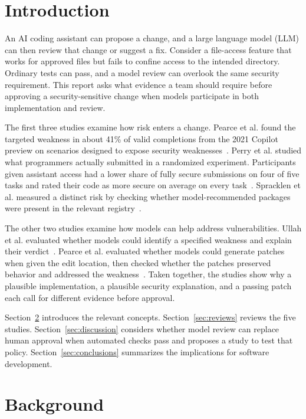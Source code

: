 \documentclass[conference]{IEEEtran}
\begin{document}
\section{Introduction}\label{sec:introduction}
An AI coding assistant can propose a change, and a large language model (LLM) can then review that change or suggest a fix. Consider a file-access feature that works for approved files but fails to confine access to the intended directory. Ordinary tests can pass, and a model review can overlook the same security requirement. This report asks what evidence a team should require before approving a security-sensitive change when models participate in both implementation and review.

The first three studies examine how risk enters a change. Pearce et al. found the targeted weakness in about 41\% of valid completions from the 2021 Copilot preview on scenarios designed to expose security weaknesses~\cite{pearce2025copilot}. Perry et al. studied what programmers actually submitted in a randomized experiment. Participants given assistant access had a lower share of fully secure submissions on four of five tasks and rated their code as more secure on average on every task~\cite{perry2023insecure}. Spracklen et al. measured a distinct risk by checking whether model-recommended packages were present in the relevant registry~\cite{spracklen2025packages}.

The other two studies examine how models can help address vulnerabilities. Ullah et al. evaluated whether models could identify a specified weakness and explain their verdict~\cite{ullah2024secllmholmes}. Pearce et al. evaluated whether models could generate patches when given the edit location, then checked whether the patches preserved behavior and addressed the weakness~\cite{pearce2023repair}. Taken together, the studies show why a plausible implementation, a plausible security explanation, and a passing patch each call for different evidence before approval.

Section~\ref{sec:background} introduces the relevant concepts. Section~\ref{sec:reviews} reviews the five studies. Section~\ref{sec:discussion} considers whether model review can replace human approval when automated checks pass and proposes a study to test that policy. Section~\ref{sec:conclusions} summarizes the implications for software development.

\section{Background}\label{sec:background}
\end{document}
